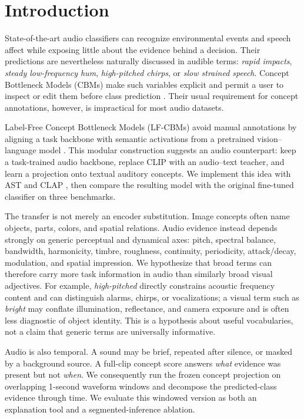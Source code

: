 \documentclass[10pt]{article}
\begin{document}
\section{Introduction}
State-of-the-art audio classifiers can recognize environmental events and speech affect while exposing little about the evidence behind a decision. Their predictions are nevertheless naturally discussed in audible terms: \emph{rapid impacts}, \emph{steady low-frequency hum}, \emph{high-pitched chirps}, or \emph{slow strained speech}. Concept Bottleneck Models (CBMs) make such variables explicit and permit a user to inspect or edit them before class prediction \citep{koh2020concept}. Their usual requirement for concept annotations, however, is impractical for most audio datasets.

Label-Free Concept Bottleneck Models (LF-CBMs) avoid manual annotations by aligning a task backbone with semantic activations from a pretrained vision--language model \citep{oikarinen2023labelfree}. This modular construction suggests an audio counterpart: keep a task-trained audio backbone, replace CLIP with an audio--text teacher, and learn a projection onto textual auditory concepts. We implement this idea with AST \citep{gong2021ast} and CLAP \citep{elizalde2023clap}, then compare the resulting model with the original fine-tuned classifier on three benchmarks.

The transfer is not merely an encoder substitution. Image concepts often name objects, parts, colors, and spatial relations. Audio evidence instead depends strongly on generic perceptual and dynamical axes: pitch, spectral balance, bandwidth, harmonicity, timbre, roughness, continuity, periodicity, attack/decay, modulation, and spatial impression. We hypothesize that broad terms can therefore carry more task information in audio than similarly broad visual adjectives. For example, \emph{high-pitched} directly constrains acoustic frequency content and can distinguish alarms, chirps, or vocalizations; a visual term such as \emph{bright} may conflate illumination, reflectance, and camera exposure and is often less diagnostic of object identity. This is a hypothesis about useful vocabularies, not a claim that generic terms are universally informative.

Audio is also temporal. A sound may be brief, repeated after silence, or masked by a background source. A full-clip concept score answers \emph{what} evidence was present but not \emph{when}. We consequently run the frozen concept projection on overlapping 1-second waveform windows and decompose the predicted-class evidence through time. We evaluate this windowed version as both an explanation tool and a segmented-inference ablation.
\end{document}
